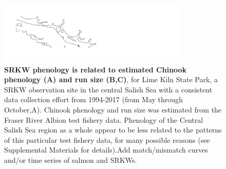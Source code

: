\documentclass{article}
\begin{document}
\begin{figure}[p]
\includegraphics[width=0.8\textwidth]{../analyses/orcaphen/figures/lime_albchin.pdf} 
\caption{\textbf{SRKW phenology is related to estimated Chinook phenology (A) and run size (B,C)}, for Lime Kiln State Park, a SRKW observation site in the central Salish Sea with a consistent data collection effort from 1994-2017 (from May through October,A). Chinook phenology and run size was estimated from the Fraser River Albion test fishery data. Phenology of the Central Salish Sea region as a whole appear to be less related to the patterns of this particular test fishery data, for many possible reasons (see Supplemental Materials for details).Add match/mismatch curves and/or time series of salmon and SRKWs. }
 \label{fig:shifts2}
 \end{figure}
\end{document}
